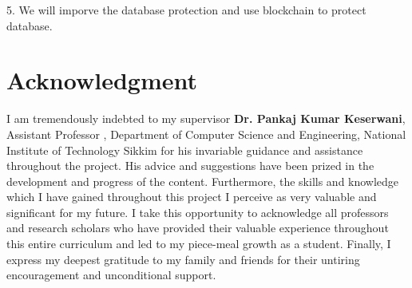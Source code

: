 \documentclass[conference]{IEEEtran}
\begin{document}
5. We will imporve the database protection and use blockchain to protect database.


\section*{Acknowledgment} I am tremendously indebted to my supervisor {\bf Dr. Pankaj Kumar Keserwani}, Assistant Professor , Department of Computer Science and Engineering, National Institute of Technology Sikkim for his invariable guidance and assistance throughout the project. His advice and suggestions have been prized in the development and progress of the content. Furthermore, the skills and knowledge which I have gained throughout this project I perceive as very valuable and significant for my future. I take this opportunity to acknowledge all professors and research scholars who have provided their valuable experience throughout this entire curriculum and led to my piece-meal growth as a student. Finally, I express my deepest gratitude to my family and friends for their untiring encouragement and unconditional support.
\end{document}
